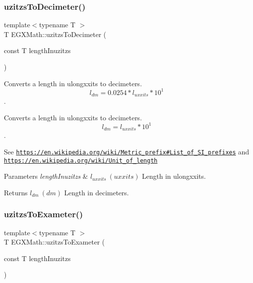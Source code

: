 \subsubsection{\texorpdfstring{uzitzs\+To\+Decimeter()}{uzitzsToDecimeter()}}
{\footnotesize\ttfamily template$<$typename T $>$ \\
T E\+G\+X\+Math\+::uzitzs\+To\+Decimeter (\begin{DoxyParamCaption}\item[{const T}]{length\+Inuzitzs }\end{DoxyParamCaption})}



Converts a length in ulongxxits to decimeters. \[ l_{dm}=0.0254 * l_{uxxits} * 10^{1} \]. 

Converts a length in ulongxxits to decimeters. \[ l_{dm}=l_{uxxits} * 10^{1} \].

See \href{https://en.wikipedia.org/wiki/Metric_prefix#List_of_SI_prefixes}{\tt https\+://en.\+wikipedia.\+org/wiki/\+Metric\+\_\+prefix\#\+List\+\_\+of\+\_\+\+S\+I\+\_\+prefixes} and \href{https://en.wikipedia.org/wiki/Unit_of_length}{\tt https\+://en.\+wikipedia.\+org/wiki/\+Unit\+\_\+of\+\_\+length} 
\begin{DoxyParams}{Parameters}
{\em length\+Inuzitzs} & $ l_{uxxits}\ (uxxits)$ Length in ulongxxits. \\
\hline
\end{DoxyParams}
\begin{DoxyReturn}{Returns}
$ l_{dm}\ (dm)$ Length in decimeters. 
\end{DoxyReturn}
\mbox{\label{group___e_g_x_math-_conversions-_length_conversions-_imperial-uzitzs-_s_i_ga4c102f14f5804c46db22137411ceb3be}} 
\subsubsection{\texorpdfstring{uzitzs\+To\+Exameter()}{uzitzsToExameter()}}
{\footnotesize\ttfamily template$<$typename T $>$ \\
T E\+G\+X\+Math\+::uzitzs\+To\+Exameter (\begin{DoxyParamCaption}\item[{const T}]{length\+Inuzitzs }\end{DoxyParamCaption})}




